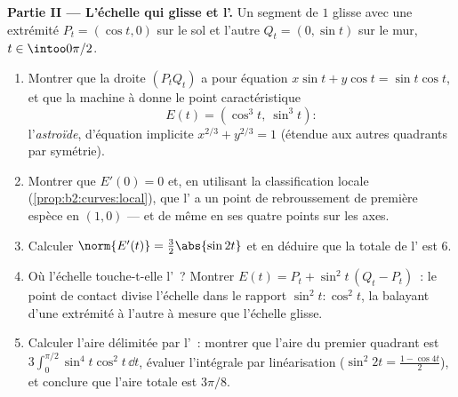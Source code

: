 \begin{problem}
\medskip
\noindent\textbf{Partie II --- L'échelle qui glisse et
l'.} Un segment de  $1$ glisse avec une extrémité
$P_t =
(\cos t, 0)$ sur le sol et l'autre $Q_t = (0, \sin t)$ sur
le mur, $t \in \intoo0{\pi/2}$.
\begin{enumerate}[resume]
  \item Montrer que la droite $(P_tQ_t)$ a pour équation $x\sin t +
        y\cos t = \sin t\cos t$, et que la machine à 
        donne le point caractéristique
        \[
        E(t) = (\cos^3 t,\ \sin^3 t) :
        \]
        l'\emph{astroïde}, d'équation implicite
        $x^{2/3} + y^{2/3} = 1$ (étendue aux
        autres quadrants par symétrie).
  \item Montrer que $E'(0) = 0$ et, en utilisant la classification
        locale (\cref{prop:b2:curves:local}), que
        l' a un point de rebroussement de première espèce
        en $(1, 0)$
        --- et de même en ses quatre points sur les axes.
  \item Calculer $\norm{E'(t)} = \tfrac32\abs{\sin 2t}$ et
        en déduire que la  totale de l' est $6$.
  \item Où l'échelle touche-t-elle l'~? Montrer $E(t) =
        P_t + \sin^2 t\,(Q_t - P_t)$~: le point de contact
        divise l'échelle dans le rapport $\sin^2 t : \cos^2
        t$, la balayant d'une extrémité à l'autre à mesure que
        l'échelle glisse.
  \item Calculer l'aire délimitée par l'~: montrer que
        l'aire du premier quadrant est $3\int_0^{\pi/2}\sin^4
        t\cos^2 t\,\dd t$, évaluer l'intégrale par
        linéarisation ($\sin^2 2t = \tfrac{1 - \cos 4t}2$),
        et conclure que l'aire totale est $3\pi/8$.
\end{enumerate}


\end{problem}
